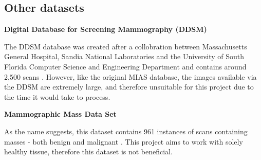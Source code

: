 \subsection{Other datasets}

\noindent \textbf{Digital Database for Screening Mammography (DDSM)}

The \acrshort{DDSM} database was created after a collobration between Massachusetts General Hospital, Sandia National Laboratories and the University of South Florida Computer Science and Engineering Department and contains around 2,500 scans \cite{Heath_Bowyer_Kopans_Moore_Kegelmeyer_Processing} \cite{Heath_Bowyer_Kopans_Kegelmeyer_Moore_Chang_MunishKumaran_1998}.
However, like the original \acrshort{MIAS} database, the images available via the DDSM are extremely large, and therefore unsuitable for this project due to the time it would take to process.

\noindent \textbf{Mammographic Mass Data Set}

As the name suggests, this dataset contains 961 instances of scans containing masses - both benign and malignant \cite{Elter_Schulz-Wendtland_Wittenberg_2007}. This project aims to work with solely healthy tissue, therefore this dataset is not beneficial.

